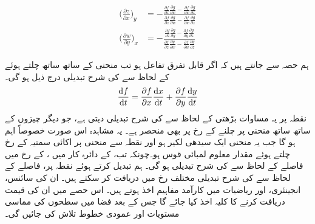 \begin{align*}
\big(\frac{\partial z}{\partial x}\big)_y&=-\frac{\frac{\partial f}{\partial x}\frac{\partial g}{\partial w}-\frac{\partial f}{\partial w}\frac{\partial g}{\partial x}}{\frac{\partial f}{\partial z}\frac{\partial g}{\partial w}-\frac{\partial f}{\partial w}\frac{\partial g}{\partial z}}\\
\big(\frac{\partial w}{\partial y}\big)_x&=-\frac{\frac{\partial f}{\partial z}\frac{\partial g}{\partial y}-\frac{\partial f}{\partial y}\frac{\partial g}{\partial z}}{\frac{\partial f}{\partial z}\frac{\partial g}{\partial w}-\frac{\partial f}{\partial w}\frac{\partial g}{\partial z}}
\end{align*}



ہم حصہ  سے جانتے ہیں کہ اگر       قابل تفرق تفاعل ہو تب  منحنی  کے ساتھ ساتھ چلتے ہوئے   کے لحاظ سے   کی شرح تبدیلی درج ذیل ہو گی۔
\begin{align*}
\frac{\dif f}{\dif t}=\frac{\partial f}{\partial x}\frac{\dif x}{\dif t}+\frac{\partial f}{\partial y}\frac{\dif y}{\dif t}
\end{align*} 
نقطہ   پر یہ مساوات بڑھتی  کے لحاظ سے  کی شرح تبدیلی دیتی ہے،  جو دیگر  چیزوں کے ساتھ   ساتھ منحنی پر چلنے کے رخ پر بھی منحصر ہے۔ یہ  مشاہدہ   اس صورت خصوصاً     اہم  ہو  گا  جب یہ    منحنی ایک سیدھی  لکیر ہو  اور نقطہ   سے منحنی پر اکائی سمتیہ  کے رخ  چلتے ہوئے  مقدار معلوم لمبائی قوس     ہو۔چونکہ تب،  کے دائرہ کار میں  ،    کے رخ میں فاصلے کے لحاظ  سے    کی شرح تبدیلی   ہو گی۔ ہم      تبدیل کرتے ہوئے نقطہ  پر،     فاصلے کے لحاظ سے  کی  شرح تبدیلی      مختلف رخ میں دریافت کر سکتے ہیں۔   ان   کی  سائنس،  انجینئری،  اور ریاضیات   میں کارآمد  مفاہیم  اخذ ہوتے ہیں۔ اس حصے  میں ان کی قیمت دریافت کرنے کا کلیہ اخذ کیا جائے گا جس کے بعد فضا میں سطحوں کی  مماسی مستویات  اور عمودی  خطوط  تلاش کی جائیں گی۔

